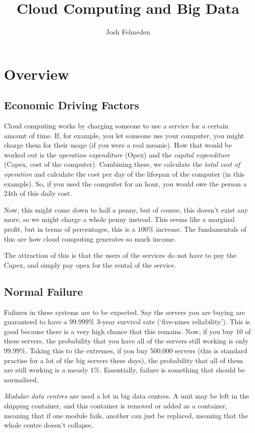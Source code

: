 \documentclass[11pt,a4paper,titlepage,dvipsnames,cmyk]{scrartcl}
\title{Cloud Computing and Big Data}
\author{Josh Felmeden}
\begin{document}
\maketitle
\tableofcontents
\newpage
\section{Overview}
\subsection{Economic Driving Factors}
Cloud computing works by charging someone to use a service for a certain amount of time. If, for example, you let someone use your computer, you might charge them for their usage (if you were a real meanie). How that would be worked out is the \textit{operation expenditure} (Opex) and the \textit{capital expenditure} (Capex, cost of the computer). Combining these, we calculate the \textit{total cost of operation} and calculate the cost per day of the lifespan of the computer (in this example). So, if you used the computer for an hour, you would owe the person a 24th of this daily cost.

Now, this might come down to half a penny, but of course, this doesn't exist any more, so we might charge a whole penny instead. This seems like a marginal profit, but in terms of percentages, this is a $100\%$ increase. The fundamentals of this are how cloud computing generates so much income.

The attraction of this is that the users of the services do not have to pay the Capex, and simply pay opex for the rental of the service.

\subsection{Normal Failure}
Failures in these systems are to be expected. Say the servers you are buying are guaranteed to have a $99.999\%$ 3-year survival rate (`five-nines reliability'). This is good because there is a very high chance that this remains. Now, if you buy 10 of these servers, the probability that you have all of the servers still working is only $99.99\%$. Taking this to the extremes, if you buy 500,000 servers (this is standard practise for a lot of the big servers these days), the probability that all of them are still working is a measly $1\%$. Essentially, failure is something that should be normalised.

\textit{Modular data centres} are used a lot in big data centres. A unit may be left in the shipping container, and this container is removed or added as a container, meaning that if one module fails, another can just be replaced, meaning that the whole centre doesn't collapse.
\end{document}
